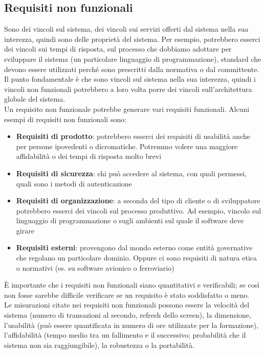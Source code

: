 \subsection{Requisiti non funzionali}
Sono dei vincoli sul sistema, dei vincoli sui servizi offerti dal sistema nella sua interezza, quindi sono delle proprietà del sistema.
Per esempio, potrebbero esserci dei vincoli sui tempi di risposta, sul processo che dobbiamo adottare per sviluppare il sistema (un particolare linguaggio di programmazione), standard che devono essere utilizzati perché sono prescritti dalla normativa o dal committente.\\
Il punto fondamentale è che sono vincoli sul sistema nella sua interezza, quindi i vincoli non funzionali potrebbero a loro volta porre dei vincoli sull'architettura globale del sistema.\\
Un requisito non funzionale potrebbe generare vari requisiti funzionali.
Alcuni esempi di requisiti non funzionali sono:
\begin{itemize}[noitemsep]
    \item \textbf{Requisiti di prodotto}: potrebbero esserci dei requisiti di usabilità anche per persone ipovedenti o dicromatiche. Potremmo volere una maggiore affidabilità o dei tempi di risposta molto brevi
    \item \textbf{Requisiti di sicurezza}: chi può accedere al sistema, con quali permessi, quali sono i metodi di autenticazione
    \item \textbf{Requisiti di organizzazione}: a seconda del tipo di cliente o di sviluppatore potrebbero esserci dei vincoli sul processo produttivo. Ad esempio, vincolo sul linguaggio di programmazione o sugli ambienti sul quale il software deve girare
    \item \textbf{Requisiti esterni}: provengono dal mondo esterno come entità governative che regolano un particolare dominio. Oppure ci sono requisiti di natura etica o normativi (es. su software avionico o ferroviario)
\end{itemize}
È importante che i requisiti non funzionali siano quantitativi e verificabili; se così non fosse sarebbe difficile verificare se un requisito è stato soddisfatto o meno.\\
Le misurazioni citate nei requisiti non funzionali possono essere la velocità del sistema (numero di transazioni al secondo, refresh dello screen), la dimensione, l'usabilità (può essere quantificata in numero di ore utilizzate per la formazione), l'affidabilità (tempo medio tra un fallimento e il successivo; probabilità che il sistema non sia raggiungibile), la robustezza o la portabilità.

